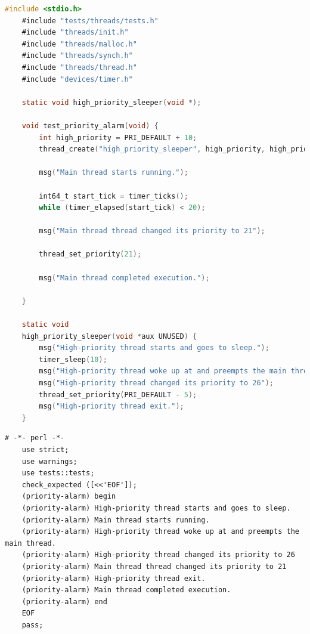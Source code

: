 \documentclass{article}
\begin{document}
\begin{lstlisting}[language=C, title=\texttt{pintos/src/tests/threads/priority-alarm.c}]
	#include <stdio.h>
	#include "tests/threads/tests.h"
	#include "threads/init.h"
	#include "threads/malloc.h"
	#include "threads/synch.h"
	#include "threads/thread.h"
	#include "devices/timer.h"
	
	static void high_priority_sleeper(void *);
	
	void test_priority_alarm(void) {
		int high_priority = PRI_DEFAULT + 10;
		thread_create("high_priority_sleeper", high_priority, high_priority_sleeper, NULL);
		
		msg("Main thread starts running.");
		
		int64_t start_tick = timer_ticks();
		while (timer_elapsed(start_tick) < 20);
		
		msg("Main thread thread changed its priority to 21");
		
		thread_set_priority(21);
		
		msg("Main thread completed execution.");
		
	}
	
	static void
	high_priority_sleeper(void *aux UNUSED) {
		msg("High-priority thread starts and goes to sleep.");
		timer_sleep(10);
		msg("High-priority thread woke up at and preempts the main thread.");
		msg("High-priority thread changed its priority to 26");
		thread_set_priority(PRI_DEFAULT - 5);
		msg("High-priority thread exit.");
	}	
\end{lstlisting}

\begin{lstlisting}[title=\texttt{pintos/src/tests/threads/priority-alarm.ck}]
	# -*- perl -*-
	use strict;
	use warnings;
	use tests::tests;
	check_expected ([<<'EOF']);
	(priority-alarm) begin
	(priority-alarm) High-priority thread starts and goes to sleep.
	(priority-alarm) Main thread starts running.
	(priority-alarm) High-priority thread woke up at and preempts the main thread.
	(priority-alarm) High-priority thread changed its priority to 26
	(priority-alarm) Main thread thread changed its priority to 21
	(priority-alarm) High-priority thread exit.
	(priority-alarm) Main thread completed execution.
	(priority-alarm) end
	EOF
	pass;
\end{lstlisting}
\end{document}
